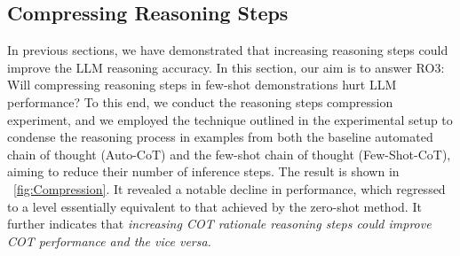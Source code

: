 \documentclass[11pt]{article}
\begin{document}
\subsection{Compressing Reasoning Steps }
\label{section4.4}
\begin{table}[!h]
\small
\caption{Making deliberate alterations to sample questions}
\end{table}
In previous sections, we have demonstrated that increasing reasoning steps could improve the LLM reasoning accuracy. In this section, our aim is to answer RO3: Will compressing reasoning steps in few-shot demonstrations hurt LLM performance?
To this end, we conduct the reasoning steps compression experiment, and we employed the technique outlined in the experimental setup to condense the reasoning process in examples from both the baseline automated chain of thought (Auto-CoT) and the few-shot chain of thought (Few-Shot-CoT), aiming to reduce their number of inference steps. The result is shown in ~\autoref{fig:Compression}. It revealed a notable decline in performance, which regressed to a level essentially equivalent to that achieved by the zero-shot method. It further indicates that \emph{increasing COT rationale reasoning steps could improve COT performance and the vice versa.}
\end{document}
